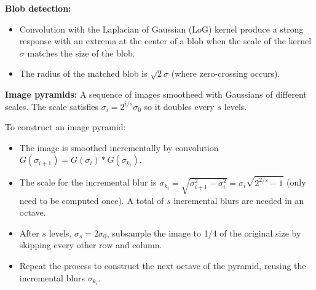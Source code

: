 \documentclass[12pt]{article}
\begin{document}
\textbf{Blob detection:}
\begin{itemize}
    \item Convolution with the Laplacian of Gaussian (LoG) kernel produce a strong response with an extrema at the center of a blob when the scale of the kernel $\sigma$ matches the size of the blob. 
    \item The radius of the matched blob is $\sqrt{2} \sigma$ (where zero-crossing occurs).
\end{itemize}

\textbf{Image pyramids:} A sequence of images smootheed with Gaussians of different scales. The scale satisfies $\sigma_{i} = 2^{i/s} \sigma_0$ so it doubles every $s$ levels. 

To construct an image pyramid:
\begin{itemize}
    \item The image is smoothed incrementally by convolution $G(\sigma_{i+1}) = G(\sigma_i) * G(\sigma_{k_i})$.
    \item The scale for the incremental blur is $\sigma_{k_i} = \sqrt{\sigma_{i+1}^2 - \sigma_i^2} = \sigma_i \sqrt{2^{2/s} - 1}$ (only need to be computed once). A total of $s$ incremental blurs are needed in an octave.
    \item After $s$ levels, $\sigma_s = 2 \sigma_0$, subsample the image to 1/4 of the original size by skipping every other row and column.
    \item Repeat the process to construct the next octave of the pyramid, reusing the incremental blurs $\sigma_{k_i}$.
\end{itemize}
\end{document}
